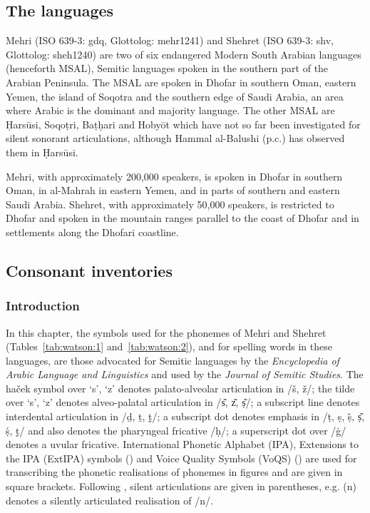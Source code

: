 \documentclass[output=paper]{langscibook}
\begin{document}
\subsection{The languages} %
\label{sec:watson:2.1}
Mehri (ISO 639-3: gdq, Glottolog: mehr1241) and Shehret (ISO 639-3: shv, Glottolog: sheh1240) are two of six endangered Modern South Arabian languages (henceforth MSAL), Semitic languages spoken in the southern part of the Arabian Peninsula. The MSAL are spoken in Dhofar in southern Oman, eastern Yemen, the island of Soqotra and the southern edge of Saudi Arabia, an area where Arabic is the dominant and majority language. The other MSAL are Ḥarsūsi, Soqoṭri, Baṭḥari and Hobyōt which have not so far been investigated for silent sonorant articulations, although Hammal al-Balushi (p.c.) has observed them in Ḥarsūsi.

Mehri, with approximately 200,000 speakers, is spoken in Dhofar in southern Oman, in al-Mahrah in eastern Yemen, and in parts of southern and eastern Saudi Arabia. Shehret, with approximately 50,000 speakers, is restricted to Dhofar and spoken in the mountain ranges parallel to the coast of Dhofar and in settlements along the Dhofari coastline.

\subsection{Consonant inventories} %
\label{sec:watson:2.2}
\subsubsection{Introduction}
In this chapter, the symbols used for the phonemes of Mehri and Shehret (Tables~\ref{tab:watson:1} and~\ref{tab:watson:2}), and for spelling words in these languages, are those advocated for Semitic languages by the \textit{Encyclopedia of Arabic Language and Linguistics} and used by the \textit{Journal of Semitic Studies}. The haček symbol over ‘s’, ‘z’ denotes palato-alveolar articulation in /š, ž/; the tilde over ‘s’, ‘z’ denotes alveo-palatal articulation in \mbox{/s͂,} z͂, ṣ͂/; a subscript line denotes interdental articulation in /ḏ, ṯ, ṯ̣/; a subscript dot denotes emphasis in /ṭ, ṣ, ṣ̌, ṣ͂, ṣ́, ṯ̣/ and also denotes the pharyngeal fricative \mbox{/ḥ/}; a superscript dot over /\.g/ denotes a uvular fricative. International Phonetic Alphabet (IPA), Extensions to the IPA (ExtIPA) symbols (\citealt{BallMiller2018}) and Voice Quality Symbols (VoQS) (\citealt{BallDickson2018}) are used for transcribing the phonetic realisations of phonemes in figures and are given in square brackets. Following \citet{BallDickson2018}, silent articulations are given in parentheses, e.g. (n) denotes a silently articulated realisation of \mbox{/n/}.
\end{document}
